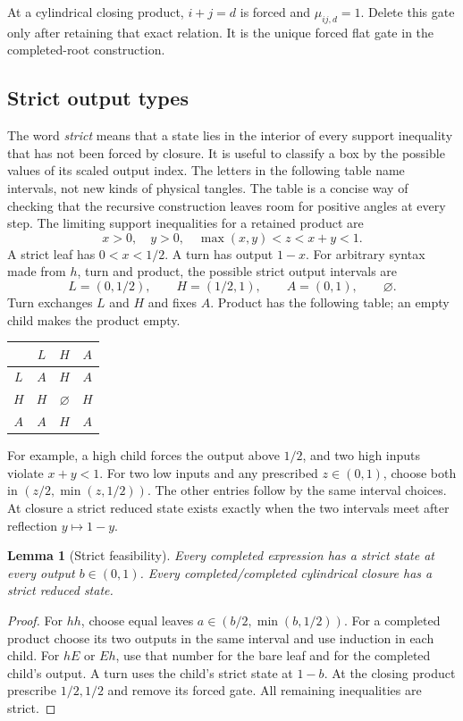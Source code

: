 \documentclass[11pt]{article}
\numberwithin{equation}{section}
\newtheorem{lemma}[theorem]{Lemma}
\theoremstyle{definition}\newtheorem{definition}[theorem]{Definition}
\theoremstyle{remark}\newtheorem{remark}[theorem]{Remark}
\begin{document}
At a cylindrical closing product, $i+j=d$ is forced and $\mu_{ij,d}=1$. Delete this gate only after retaining that exact relation. It is the unique forced flat gate in the completed-root construction.

\subsection{Strict output types}

The word \emph{strict} means that a state lies in the interior of every support inequality that has not been forced by closure. It is useful to classify a box by the possible values of its scaled output index. The letters in the following table name intervals, not new kinds of physical tangles. The table is a concise way of checking that the recursive construction leaves room for positive angles at every step.
The limiting support inequalities for a retained product are
\begin{equation}\label{eq:strict-domain}
 x>0,\quad y>0,\quad \max(x,y)<z<x+y<1.
\end{equation}
A strict leaf has $0<x<1/2$. A turn has output $1-x$. For arbitrary syntax made from $h$, turn and product, the possible strict output intervals are
\[
 L=(0,1/2),\qquad H=(1/2,1),\qquad A=(0,1),\qquad\varnothing.
\]
Turn exchanges $L$ and $H$ and fixes $A$. Product has the following table; an empty child makes the product empty.
\begin{center}
\begin{tabular}{c|ccc}
 & $L$ & $H$ & $A$\\\hline
$L$ & $A$ & $H$ & $A$\\
$H$ & $H$ & $\varnothing$ & $H$\\
$A$ & $A$ & $H$ & $A$
\end{tabular}
\end{center}
For example, a high child forces the output above $1/2$, and two high inputs violate $x+y<1$. For two low inputs and any prescribed $z\in(0,1)$, choose both in $(z/2,\min(z,1/2))$. The other entries follow by the same interval choices. At closure a strict reduced state exists exactly when the two intervals meet after reflection $y\mapsto1-y$.

\begin{lemma}[Strict feasibility]\label{lem:strict-feasible}
Every completed expression has a strict state at every output $b\in(0,1)$. Every completed/completed cylindrical closure has a strict reduced state.
\end{lemma}
\begin{proof}
For $hh$, choose equal leaves $a\in(b/2,\min(b,1/2))$. For a completed product choose its two outputs in the same interval and use induction in each child. For $hE$ or $Eh$, use that number for the bare leaf and for the completed child's output. A turn uses the child's strict state at $1-b$. At the closing product prescribe $1/2,1/2$ and remove its forced gate. All remaining inequalities are strict.
\end{proof}
\end{document}
